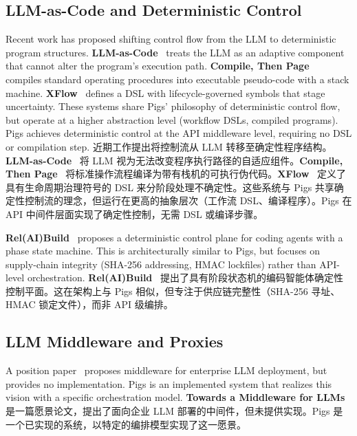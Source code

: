 \subsection{LLM-as-Code and Deterministic Control}

Recent work has proposed shifting control flow from the LLM to deterministic program structures. \textbf{LLM-as-Code}~\citep{llmascode2026} treats the LLM as an adaptive component that cannot alter the program's execution path. \textbf{Compile, Then Page}~\citep{compilepage2026} compiles standard operating procedures into executable pseudo-code with a stack machine. \textbf{XFlow}~\citep{xflow2026} defines a DSL with lifecycle-governed symbols that stage uncertainty. These systems share Pigs' philosophy of deterministic control flow, but operate at a higher abstraction level (workflow DSLs, compiled programs). Pigs achieves deterministic control at the API middleware level, requiring no DSL or compilation step.
近期工作提出将控制流从 LLM 转移至确定性程序结构。\textbf{LLM-as-Code}~\citep{llmascode2026} 将 LLM 视为无法改变程序执行路径的自适应组件。\textbf{Compile, Then Page}~\citep{compilepage2026} 将标准操作流程编译为带有栈机的可执行伪代码。\textbf{XFlow}~\citep{xflow2026} 定义了具有生命周期治理符号的 DSL 来分阶段处理不确定性。这些系统与 Pigs 共享确定性控制流的理念，但运行在更高的抽象层次（工作流 DSL、编译程序）。Pigs 在 API 中间件层面实现了确定性控制，无需 DSL 或编译步骤。

\textbf{Rel(AI)Build}~\citep{relaibuild2026} proposes a deterministic control plane for coding agents with a phase state machine. This is architecturally similar to Pigs, but focuses on supply-chain integrity (SHA-256 addressing, HMAC lockfiles) rather than API-level orchestration.
\textbf{Rel(AI)Build}~\citep{relaibuild2026} 提出了具有阶段状态机的编码智能体确定性控制平面。这在架构上与 Pigs 相似，但专注于供应链完整性（SHA-256 寻址、HMAC 锁定文件），而非 API 级编排。

\subsection{LLM Middleware and Proxies}

A position paper~\citep{dzanic2024middleware} proposes middleware for enterprise LLM deployment, but provides no implementation. Pigs is an implemented system that realizes this vision with a specific orchestration model.
\textbf{Towards a Middleware for LLMs}~\citep{dzanic2024middleware} 是一篇愿景论文，提出了面向企业 LLM 部署的中间件，但未提供实现。Pigs 是一个已实现的系统，以特定的编排模型实现了这一愿景。

